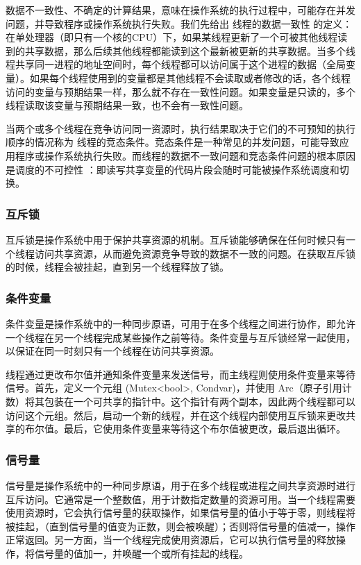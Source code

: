 数据不一致性、不确定的计算结果，意味在操作系统的执行过程中，可能存在并发问题，并导致程序或操作系统执行失败。我们先给出 线程的数据一致性 的定义：在单处理器（即只有一个核的CPU）下，如果某线程更新了一个可被其他线程读到的共享数据，那么后续其他线程都能读到这个最新被更新的共享数据。当多个线程共享同一进程的地址空间时，每个线程都可以访问属于这个进程的数据（全局变量）。如果每个线程使用到的变量都是其他线程不会读取或者修改的话，各个线程访问的变量与预期结果一样，那么就不存在一致性问题。如果变量是只读的，多个线程读取该变量与预期结果一致，也不会有一致性问题。

当两个或多个线程在竞争访问同一资源时，执行结果取决于它们的不可预知的执行顺序的情况称为 线程的竞态条件。竞态条件是一种常见的并发问题，可能导致应用程序或操作系统执行失败。而线程的数据不一致问题和竞态条件问题的根本原因是调度的不可控性 ：即读写共享变量的代码片段会随时可能被操作系统调度和切换。

\subsubsection{互斥锁}

互斥锁是操作系统中用于保护共享资源的机制。互斥锁能够确保在任何时候只有一个线程访问共享资源，从而避免资源竞争导致的数据不一致的问题。在获取互斥锁的时候，线程会被挂起，直到另一个线程释放了锁。

\subsubsection{条件变量}

条件变量是操作系统中的一种同步原语，可用于在多个线程之间进行协作，即允许一个线程在另一个线程完成某些操作之前等待。条件变量与互斥锁经常一起使用，以保证在同一时刻只有一个线程在访问共享资源。

线程通过更改布尔值并通知条件变量来发送信号，而主线程则使用条件变量来等待信号。首先，定义一个元组 (Mutex<bool>, Condvar)，并使用 Arc（原子引用计数）将其包装在一个可共享的指针中。这个指针有两个副本，因此两个线程都可以访问这个元组。然后，启动一个新的线程，并在这个线程内部使用互斥锁来更改共享的布尔值。最后，它使用条件变量来等待这个布尔值被更改，最后退出循环。

\subsubsection{信号量}

信号量是操作系统中的一种同步原语，用于在多个线程或进程之间共享资源时进行互斥访问。它通常是一个整数值，用于计数指定数量的资源可用。当一个线程需要使用资源时，它会执行信号量的获取操作，如果信号量的值小于等于零，则线程将被挂起，（直到信号量的值变为正数，则会被唤醒）；否则将信号量的值减一，操作正常返回。另一方面，当一个线程完成使用资源后，它可以执行信号量的释放操作，将信号量的值加一，并唤醒一个或所有挂起的线程。

